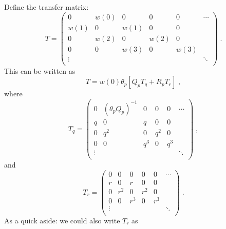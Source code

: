 \documentclass[a4paper,10pt]{article}
\begin{document}
Define the transfer matrix:
\begin{equation}
  T = \begin{pmatrix}
       0      & w(0)   & 0      & 0      & 0      & \cdots \\
       w(1)   & 0      & w(1)   & 0      & 0      &        \\
       0      & w(2)   & 0      & w(2)   & 0      &        \\
       0      & 0      & w(3)   & 0      & w(3)   &        \\
       \vdots &        &        &        &        & \ddots \\
      \end{pmatrix} \;.
\end{equation}
This can be written as
\begin{equation}
  T  = w(0) \theta_p \left[ Q_p T_q + R_p T_r \right] \;,
\end{equation}
where
\begin{equation}
  T_q = \begin{pmatrix}
         0      & (\theta_p Q_p)^{-1} & 0      & 0      & 0      & \cdots \\
         q      & 0                   & q      & 0      & 0      &        \\
         0      & q^2                 & 0      & q^2    & 0      &        \\
         0      & 0                   & q^3    & 0      & q^3    &        \\
         \vdots &                     &        &        &        & \ddots \\
        \end{pmatrix} \;,
\end{equation}
and
\begin{equation}
  T_r = \begin{pmatrix}
         0      & 0     & 0      & 0      & 0      & \cdots \\
         r      & 0     & r      & 0      & 0      &        \\
         0      & r^2   & 0      & r^2    & 0      &        \\
         0      & 0     & r^3    & 0      & r^3    &        \\
         \vdots &       &        &        &        & \ddots \\
        \end{pmatrix} \;.
\end{equation}
As a quick aside: we could also write $T_r$ as
\end{document}

